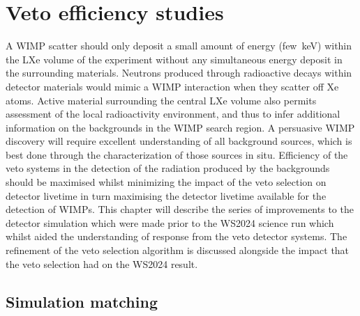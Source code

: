 \chapter{Veto efficiency studies}\label{chap:VetoEfficiency}
A WIMP scatter should only deposit a small amount of energy (few~keV) within the LXe volume of the experiment without any simultaneous energy deposit in the surrounding materials. Neutrons produced through radioactive decays within detector materials would mimic a WIMP interaction when they scatter off Xe atoms. Active material surrounding the central LXe volume also permits assessment of the local radioactivity environment, and thus to infer additional information on the backgrounds in the WIMP search region. A persuasive WIMP discovery will require excellent understanding of all background sources, which is best done through the characterization of those sources in situ. Efficiency of the veto systems in the detection of the radiation produced by the backgrounds should be maximised whilst minimizing the impact of the veto selection on detector livetime in turn maximising the detector livetime available for the detection of WIMPs. This chapter will describe the series of improvements to the detector simulation which were made prior to the WS2024 science run which whilst aided the understanding of response from the veto detector systems. The refinement of the veto selection algorithm is discussed alongside the impact that the veto selection had on the WS2024 result.

\section{Simulation matching}\label{sec:Veto/simulation_improvements}
